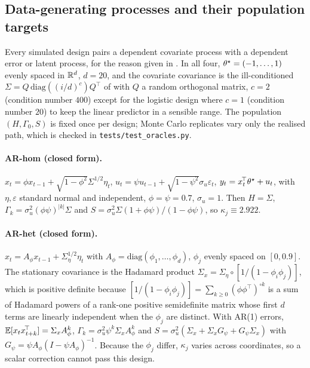 \subsection{Data-generating processes and their population targets}
\label{app:dgps}

Every simulated design pairs a dependent covariate process with a dependent error or latent
process, for the reason given in . In all four, $\theta^\star=(-1,\dots,1)$ evenly
spaced in $\mathbb{R}^{d}$, $d=20$, and the covariate covariance is the ill-conditioned
$\Sigma=Q\,\mathrm{diag}((i/d)^{c})Q^{\!\top}$ of \citet{boyer2023asymptotic} with $Q$ a
random orthogonal matrix, $c=2$ (condition number $400$) except for the logistic design where
$c=1$ (condition number $20$) to keep the linear predictor in a sensible range. The
population $(H,\Gamma_0,S)$ is fixed once per design; Monte Carlo replicates vary only the
realised path, which is checked in \texttt{tests/test\_oracles.py}.

\paragraph{AR-hom (closed form).}
$x_t=\phi x_{t-1}+\sqrt{1-\phi^2}\Sigma^{1/2}\eta_t$,
$u_t=\psi u_{t-1}+\sqrt{1-\psi^2}\sigma_u\varepsilon_t$, $y_t=x_t^{\!\top}\theta^\star+u_t$, with
$\eta,\varepsilon$ standard normal and independent, $\phi=\psi=0.7$, $\sigma_u=1$. Then
$H=\Sigma$, $\Gamma_k=\sigma_u^2(\phi\psi)^{|k|}\Sigma$ and
$S=\sigma_u^2\Sigma(1+\phi\psi)/(1-\phi\psi)$, so $\kappa_j\equiv2.922$.

\paragraph{AR-het (closed form).}
$x_t=A_\phi x_{t-1}+\Sigma_\eta^{1/2}\eta_t$ with
$A_\phi=\mathrm{diag}(\phi_1,\dots,\phi_d)$, $\phi_j$ evenly spaced on $[0,0.9]$. The
stationary covariance is the Hadamard product
$\Sigma_x=\Sigma_\eta\circ[1/(1-\phi_i\phi_j)]$, which is positive definite because
$[1/(1-\phi_i\phi_j)]=\sum_{k\ge0}(\phi\phi^{\!\top})^{\circ k}$ is a sum of Hadamard powers
of a rank-one positive semidefinite matrix whose first $d$ terms are linearly independent
when the $\phi_j$ are distinct. With AR(1) errors,
$\mathbb{E}[x_tx_{t+k}^{\!\top}]=\Sigma_xA_\phi^{k}$,
$\Gamma_k=\sigma_u^2\psi^{k}\Sigma_xA_\phi^{k}$ and
$S=\sigma_u^2(\Sigma_x+\Sigma_xG_\psi+G_\psi\Sigma_x)$ with
$G_\psi=\psi A_\phi(I-\psi A_\phi)^{-1}$. Because the $\phi_j$ differ, $\kappa_j$ varies
across coordinates, so a scalar correction cannot pass this design.

